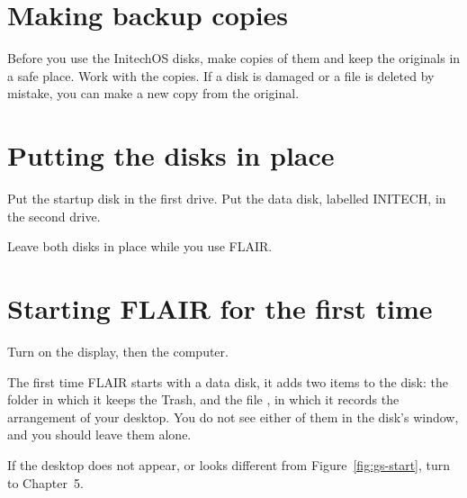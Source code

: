 \section{Making backup copies}
Before you use the InitechOS disks, make copies of them and keep the
originals in a safe place.  Work with the copies.  If a disk is damaged or a
file is deleted by mistake, you can make a new copy from the original.

\section{Putting the disks in place}
\begin{TaskSteps}
\Step Put the startup disk in the first drive.
\Step Put the data disk, labelled INITECH, in the second drive.
\end{TaskSteps}
Leave both disks in place while you use FLAIR.

\section{Starting FLAIR for the first time}
\begin{TaskSteps}
\Step Turn on the display, then the computer.
\end{TaskSteps}


The first time FLAIR starts with a data disk, it adds two items to the
disk: the folder in which it keeps the Trash, and the file
, in which it records the arrangement of your desktop.  You
do not see either of them in the disk's window, and you should leave them
alone.

If the desktop does not appear, or looks different from
Figure~\ref{fig:gs-start}, turn to Chapter~5.
